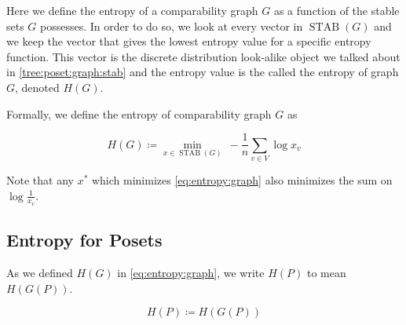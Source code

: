 Here we define the entropy of a comparability graph $G$ as a function of the stable sets $G$ possesses. In order to do so, we look at every vector in $\operatorname{STAB}(G)$ and we keep the vector that gives the lowest entropy value for a specific entropy function. This vector is the discrete distribution look-alike object we talked about in \ref{tree:poset:graph:stab} and the entropy value is the called the entropy of graph $G$, denoted ${H}(G)$.

Formally, we define the entropy of comparability graph $G$ as

\begin{equation}
{H}(G) \coloneqq \min_{x \in \operatorname{STAB}(G)}~ -\frac{1}{n} \sum_{v \in V} \log x_v
\label{eq:entropy:graph}
\end{equation}

Note that any $x^*$ which minimizes \ref{eq:entropy:graph} also minimizes the sum on $\log \frac{1}{x_v}$.



\subsection{Entropy for Posets}


As we defined ${H}(G)$ in \ref{eq:entropy:graph}, we write ${H}(P)$ to mean ${H}(G(P))$.

\begin{equation}
{H}(P) \coloneqq {H}({G}(P))
\label{eq:entropy:poset}
\end{equation}
